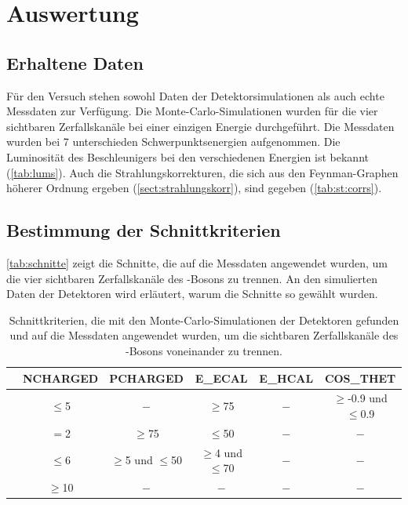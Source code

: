 \section{Auswertung}
\subsection{Erhaltene Daten}
Für den Versuch stehen sowohl Daten der Detektorsimulationen
als auch echte Messdaten zur Verfügung.
Die Monte-Carlo-Simulationen wurden für die vier sichtbaren Zerfallskanäle bei einer einzigen Energie durchgeführt.
Die Messdaten wurden bei 7 unterschieden Schwerpunktsenergien aufgenommen.
Die Luminosität des Beschleunigers bei den verschiedenen Energien ist bekannt (\autoref{tab:lums}).
Auch die Strahlungskorrekturen, die sich aus den Feynman-Graphen höherer Ordnung
ergeben (\autoref{sect:strahlungskorr}), sind gegeben (\autoref{tab:st:corrs}).





\subsection{Bestimmung der Schnittkriterien}
\autoref{tab:schnitte} zeigt die Schnitte,
die auf die Messdaten angewendet wurden,
um die vier sichtbaren Zerfallskanäle des \Z-Bosons zu trennen.
An den simulierten Daten der Detektoren wird erläutert, warum die Schnitte so gewählt wurden.

\begin{table}[H]
    \caption{Schnittkriterien, die mit den Monte-Carlo-Simulationen der Detektoren gefunden und
    auf die Messdaten angewendet wurden, um die sichtbaren Zerfallskanäle des \Z-Bosons voneinander zu trennen.}
    \begin{center}
        \begin{tabular}{|c||c|c|c|c|c|}
            \hline
        	& NCHARGED	& PCHARGED				& E\_ECAL				& E\_HCAL	& COS\_THET						\\ \hline\hline
   \Zee		& $\leq$5	& $-$					& $\geq$75				& $-$		& $\geq$-0.9 und $\leq$0.9		\\ \hline
   \Zmm		& $=$2		& $\geq$75				& $\leq$50				& $-$		& $-$							\\ \hline
   \Ztt		& $\leq$6	& $\geq$5 und $\leq$50	& $\geq$4 und $\leq$70	& $-$		& $-$							\\ \hline
   \Zqq		& $\geq$10	& $-$					& $-$					& $-$		& $-$							\\ \hline

        \end{tabular}
    \end{center}
    \label{tab:schnitte}
\end{table}



